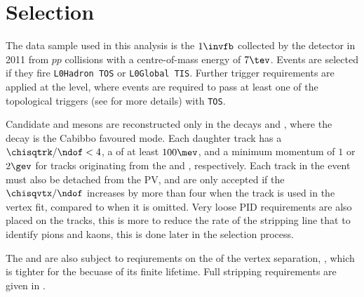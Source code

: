 \section{Selection}

%
%
%
%
%
%


The data sample used in this analysis is the
$1\invfb$ collected by the \lhcb detector in 2011 from $pp$
collisions with a centre-of-mass energy of $7\tev$.
Events are selected if they fire {\tt L0Hadron TOS} or {\tt L0Global TIS}.
Further trigger requirements are applied at the \hlttwo level, where events are required to pass at
least one of the topological triggers (see  for more details) with {\tt TOS}.

Candidate \Ds and \phii mesons are reconstructed only in the decays \decay{\Ds}{\kkpi} and
\phitokk, where the \Ds decay is the Cabibbo favoured mode.
Each daughter track has a $\chisqtrk/\ndof<4$, a \pt of at least $100\mev$, and a minimum momentum
of $1$ or $2\gev$ for tracks originating from the \Ds and \phii, respectively.
Each track in the event must also be detached from the PV, and are only accepted if the
$\chisqvtx/\ndof$ increases by more than four when the track is used in the vertex fit, compared to
when it is omitted.
Very loose PID requirements are also placed on the tracks, this is more to reduce the rate of the
stripping line that to identify pions and kaons, this is done later in the selection process.

The \Ds and \phii are also subject to reqiurements on the \chisq of the vertex separation,
\chisqvs, which is tighter for the \Ds becuase of its finite lifetime.
Full stripping requirements are given in .

